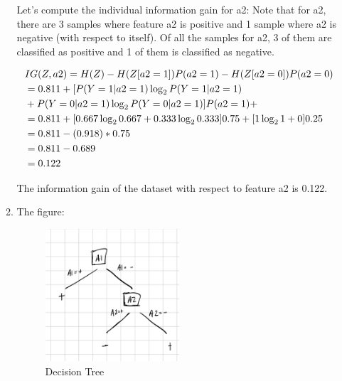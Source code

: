 \documentclass[12pt]{article}
\begin{document}
\begin{enumerate}
\begin{enumerate}
  Let's compute the individual information gain for a2: Note that for a2, there are 3 samples where feature a2 is positive and 1 sample where a2 is negative (with respect to itself). Of all the samples for a2, 3 of them are classified as positive and 1 of them is classified as negative. 

  \begin{align*}
    & IG(Z, a2) = H(Z) - H(Z[a2=1])P(a2=1) - H(Z[a2=0])P(a2=0)  \notag \\ 
    & = 0.811 + [P(Y=1|a2=1)\log_2 P(Y=1|a2=1) \notag \\ 
    & + P(Y=0|a2=1)\log_2 P(Y=0|a2=1)]P(a2=1) + \notag \\ 
    & = 0.811 + [0.667 \log_2 0.667 + 0.333 \log_2 0.333] 0.75 + [1 \log_2 1 + 0] 0.25 \notag \\ 
    & = 0.811 - (0.918) * 0.75 \notag \\ 
    & = 0.811 - 0.689 \notag \\ 
    & = 0.122 \notag
  \end{align*}

  The information gain of the dataset with respect to feature a2 is 0.122.

  \item The figure:  \\ 
  
  \begin{figure}[H]
    \centering
    \includegraphics[width=0.5\textwidth]{3_c.jpeg}
    \caption{Decision Tree}
    \label{fig:tree}
  \end{figure}




\end{enumerate}
\end{enumerate}
\end{document}

